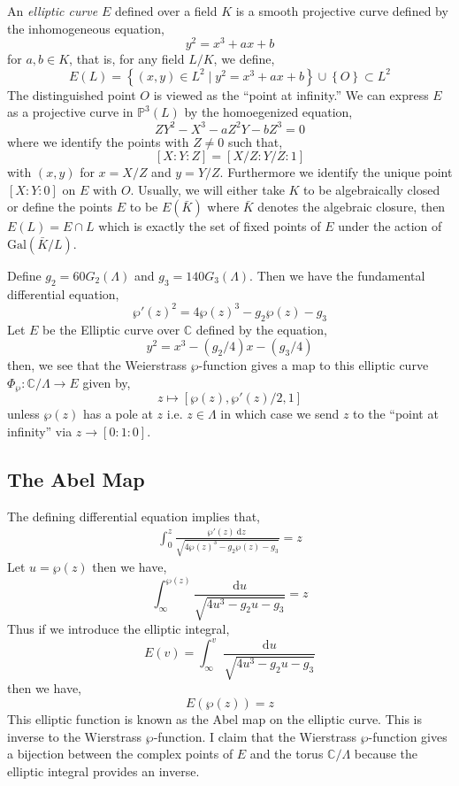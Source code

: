 \documentclass{article}
\newcommand{\Gal}[1]{\mathrm{Gal}\left( #1 \right)}
\newcommand{\C}{\mathbb{C}}
\renewcommand{\d}[1]{\: \mathrm{d}#1 \:}
\theoremstyle{definition}
\newenvironment{definition}[1][Definition:]{\begin{trivlist}
\item[\hskip \labelsep {\bfseries #1}]}{\end{trivlist}}
\renewcommand{\P}[2]{\mathbb{P}^{#1} \left( #2 \right)}
\begin{document}
\begin{definition}
An \textit{elliptic curve} $E$ defined over a field $K$ is a smooth projective curve defined by the inhomogeneous equation,
\[ y^2 = x^3 + a x + b \]
for $a,b \in K$, that is, for any field $L / K$, we define,
\[ E(L) = \left\{ (x,y) \in L^2 \mid y^2 = x^3 + ax + b \right\} \cup \left\{ O \right\} \subset L^2 \]
The distinguished point $O$ is viewed as the ``point at infinity.'' We can express $E$ as a projective curve in $\P{3}{L}$ by the homoegenized equation,
\[ ZY^2 - X^3 - a Z^2 Y - b Z^3 = 0 \]
where we identify the points with $Z \neq 0$ such that,
\[ [X : Y : Z] = [ X/Z : Y/ Z : 1]  \]
with $(x, y)$ for $x = X/Z$ and $y = Y/Z$. Furthermore we identify the unique point $[X : Y : 0]$ on $E$ with $O$. 
Usually, we will either take $K$ to be algebraically closed or define the points $E$ to be $E(\bar{K})$ where $\bar{K}$ denotes the algebraic closure, then $E(L) = E \cap L$ which is exactly the set of fixed points of $E$ under the action of $\Gal{\bar{K}/L}$. 
\end{definition}
Define $g_2 = 60 G_2(\Lambda)$ and $g_3 = 140 G_3(\Lambda)$. Then we have the fundamental differential equation,
\[ \wp'(z)^2 = 4 \wp(z)^3 - g_2 \wp(z) - g_3 \] 
Let $E$ be the Elliptic curve over $\C$ defined by the equation,
\[ y^2 = x^3 - (g_2/4) x - (g_3/4) \]
then, we see that the Weierstrass $\wp$-function gives a map to this elliptic curve $\Phi_{\wp} : \C / \Lambda \to E$ given by,
\[ z \mapsto [\wp(z), \wp'(z)/2, 1] \]
unless $\wp(z)$ has a pole at $z$ i.e. $z \in \Lambda$ in which case we send $z$ to the ``point at infinity'' via $z \to [0 : 1 : 0]$.

\subsection{The Abel Map} 

The defining differential equation implies that,
\begin{align*}
\int_{0}^{z} \frac{\wp'(z) \d{z}}{\sqrt{4 \wp(z)^3 - g_2 \wp(z) - g_3}} = z 
\end{align*}
Let $u = \wp(z)$ then we have,
\[ \int_{\infty}^{\wp(z)} \frac{\d{u}}{\sqrt{4 u^3 - g_2 u - g_3}} = z\]
Thus if we introduce the elliptic integral,
\[ E(v) = \int_{\infty}^v \frac{\d{u}}{\sqrt{4 u^3 - g_2 u - g_3}} \]
then we have,
\[ E(\wp(z)) = z \]
This elliptic function is known as the Abel map on the elliptic curve. This is inverse to the Wierstrass $\wp$-function. I claim that the Wierstrass $\wp$-function gives a bijection between the complex points of $E$ and the torus $\C / \Lambda$ because the elliptic integral provides an inverse.
\end{document}
